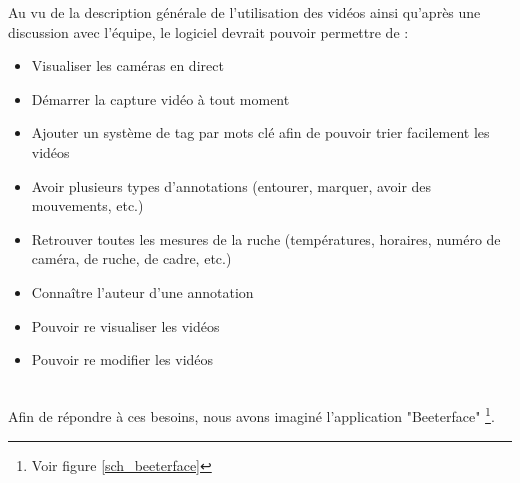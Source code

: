 \documentclass[11pt,french,a4paper]{report}
\begin{document}
Au vu de la description générale de l'utilisation des vidéos ainsi qu'après une discussion avec l'équipe, le logiciel devrait 
pouvoir permettre de : \\
\begin{itemize}[itemsep=0cm,topsep=0cm]
    \item Visualiser les caméras en direct
    \item Démarrer la capture vidéo à tout moment 
    \item Ajouter un système de tag par mots clé afin de pouvoir trier facilement les vidéos 
    \item Avoir plusieurs types d'annotations (entourer, marquer, avoir des mouvements, etc.) 
    \item Retrouver toutes les mesures de la ruche (températures, horaires, numéro de caméra, de ruche, de cadre, etc.)  
    \item Connaître l'auteur d'une annotation 
    \item Pouvoir re visualiser les vidéos 
    \item Pouvoir re modifier les vidéos 
\end{itemize} \\
Afin de répondre à ces besoins, nous avons imaginé l'application "Beeterface" \footnote{Voir figure \ref{sch_beeterface}}.
\end{document}
